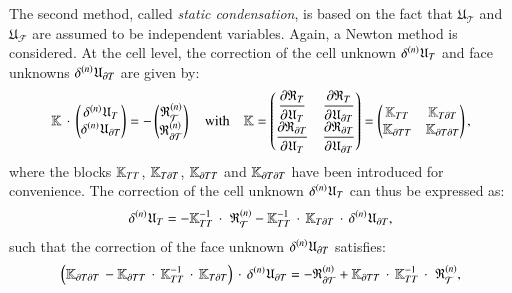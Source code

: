 The second method, called \textit{static condensation}, is based on the fact that
$\mathfrak{U}_{\mathcal{T}}$ and
$\mathfrak{U}_{\mathcal{F}}$ are assumed to be independent variables.
Again, a Newton method is considered.
%
%
%
At the cell level, the correction of the cell unknown
$\iter{n}{\delta}\mathfrak{U}_{\cell}$ and face unknowns
$\iter{n}{\delta}\mathfrak{U}_{\dCell}$ are given by:
\begin{equation}
\label{eq_static_condensation_final}
\mathbb{K}\,\cdot\,
\begin{pmatrix}
  \iter{n}{\delta}\mathfrak{U}_{\cell}
  \\
  \iter{n}{\delta}\mathfrak{U}_{\dCell}
\end{pmatrix}
= -
\begin{pmatrix}
  \iter{n}{\mathfrak{R}}_{\mathcal{\cell}}
  \\
  \iter{n}{\mathfrak{R}}_{\mathcal{\dCell}}
\end{pmatrix}
\quad\text{with}\quad \mathbb{K} =
\begin{pmatrix}
  \deriv{\mathfrak{R}_{\cell}}{\mathfrak{U}_{\cell}}
  & \deriv{\mathfrak{R}_{\cell}}{\mathfrak{U}_{\dCell}} \\
  \deriv{\mathfrak{R}_{\dCell}}{\mathfrak{U}_{\cell}}
  & \deriv{\mathfrak{R}_{\dCell}}{\mathfrak{U}_{\dCell}} \\
\end{pmatrix}
=
\begin{pmatrix}
  \mathbb{K}_{\cell\cell} &
  \mathbb{K}_{\cell\dCell} \\
  \mathbb{K}_{\dCell\cell} &
  \mathbb{K}_{\dCell\dCell} \\
\end{pmatrix},
\end{equation}
%
%
%
where the blocks \(\mathbb{K}_{\cell\cell}\),
\(\mathbb{K}_{\cell\dCell}\), \(\mathbb{K}_{\dCell\cell}\) and
\(\mathbb{K}_{\dCell\dCell}\) have been introduced for convenience.
%
%
%
The correction of the cell unknown
$\iter{n}{\delta}\mathfrak{U}_{\cell}$ can thus be expressed as:
\begin{equation}
  \label{eq:cell_unknown_correction}
  \iter{n}{\delta}\mathfrak{U}_{\cell}=
  -\mathbb{K}_{\cell\cell}^{-1}\,\cdot\,\,\iter{n}{\mathfrak{R}}_{\mathcal{\cell}}
  -\mathbb{K}_{\cell\cell}^{-1}\,\cdot\,\mathbb{K}_{\cell\dCell}\,\cdot\,\iter{n}{\delta}\mathfrak{U}_{\dCell},
\end{equation}
%
%
%
such that the correction of the face unknown
$\iter{n}{\delta}\mathfrak{U}_{\dCell}$ satisfies:
\[
\paren{ \mathbb{K}_{\dCell\dCell}\,
  -\mathbb{K}_{\dCell\cell}\,\cdot\,\mathbb{K}_{\cell\cell}^{-1}\,\cdot\,\mathbb{K}_{\cell\dCell}
 }\,\cdot\, \iter{n}{\delta}\mathfrak{U}_{\dCell}=
-\iter{n}{\mathfrak{R}}_{\mathcal{\dCell}}
+\mathbb{K}_{\dCell\cell}\,\cdot\,\mathbb{K}_{\cell\cell}^{-1}\,\cdot\,\,\iter{n}{\mathfrak{R}}_{\mathcal{\cell}},
\]
